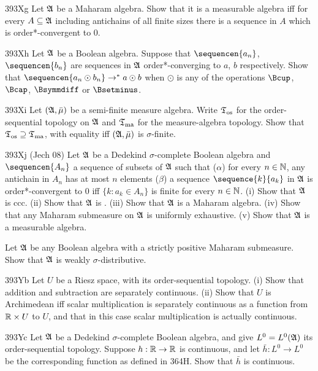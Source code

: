 {\spheader 393Xg Let $\frak A$ be a Maharam algebra.   Show that it is a
measurable algebra iff for every $A\subseteq\frak A$ including antichains
of all finite sizes there is a sequence in $A$ which is order*-convergent
to $0$.

\spheader 393Xh Let $\frak A$ be a Boolean algebra.   Suppose that
$\sequencen{a_n}$, $\sequencen{b_n}$ are sequences in $\frak A$
order*-converging to $a$, $b$ respectively.   Show that
$\sequencen{a_n\odot b_n}\to^*a\odot b$ when $\odot$ is any of the
operations $\Bcup$, $\Bcap$, $\Bsymmdiff$ or $\Bsetminus$.

\spheader 393Xi
Let $(\frak A,\bar\mu)$ be a semi-finite measure algebra.   Write
$\frak T_{\text{os}}$ for the order-sequential topology on $\frak A$ and
$\frak T_{\text{ma}}$ for the measure-algebra topology.
Show that $\frak T_{\text{os}}\supseteq\frak T_{\text{ma}}$,
with equality iff $(\frak A,\bar\mu)$ is $\sigma$-finite.

\spheader 393Xj ({\smc Jech 08}) Let $\frak A$ be a Dedekind
$\sigma$-complete Boolean algebra and $\sequencen{A_n}$ a sequence of
subsets of $\frak A$ such that ($\alpha$) for
every $n\in\Bbb N$, any antichain in $A_n$ has at most $n$ elements
($\beta$)
a sequence $\sequence{k}{a_k}$ in $\frak A$ is order*-convergent to $0$ iff
$\{k:a_k\in A_n\}$ is finite for every $n\in\Bbb N$.
(i) Show that $\frak A$ is ccc.   (ii) Show that $\frak A$ is \wsid.
(iii) Show that $\frak A$ is a Maharam algebra.  
(iv) Show that any Maharam submeasure on $\frak A$ is uniformly exhaustive.
(v) Show that $\frak A$ is a measurable algebra.

Let $\frak A$ be any Boolean algebra with a strictly positive Maharam
submeasure.   Show that $\frak A$ is weakly $\sigma$-distributive.

\spheader 393Yb Let $U$ be a Riesz space, with its order-sequential
topology.   (i) Show that addition and
subtraction are separately continuous.   (ii) Show that $U$ is
Archimedean iff scalar multiplication is separately continuous
as a function from $\Bbb R\times U$ to $U$, and that in
this case scalar multiplication is actually continuous.

\spheader 393Yc Let $\frak A$ be a Dedekind $\sigma$-complete
Boolean algebra, and give $L^0=L^0(\frak A)$ its order-sequential topology.
Suppose $h:\Bbb R\to\Bbb R$ is continuous, and let $\bar h:L^0\to L^0$ be
the corresponding function as defined in 364H.   Show that $\bar h$ is
continuous.

}
